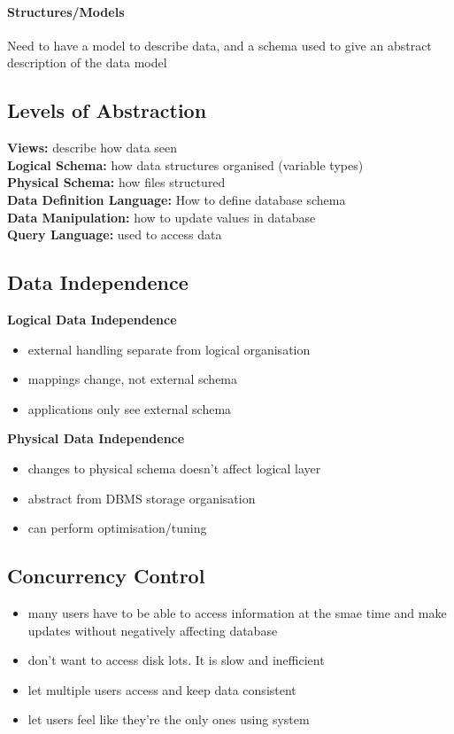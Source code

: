 \documentclass{article}
\newcommand\tab[1][0.5cm]{\hspace*{#1}}
\begin{document}
		\paragraph{Structures/Models}
		Need to have a model to describe data, and a schema used to give an abstract description of the data model

	\subsection{Levels of Abstraction}
		\tab \textbf{Views:} describe how data seen
		\\ \tab \textbf{Logical Schema:} how data structures organised (variable types)
		\\ \tab \textbf{Physical Schema:} how files structured
		\\ \tab \textbf{Data Definition Language:} How to define database schema
		\\ \tab \textbf{Data Manipulation:} how to update values in database 
		\\ \tab \textbf{Query Language:} used to access data 

	\subsection{Data Independence}
		\tab \textbf{Logical Data Independence}
		\begin{itemize}
			\item external handling separate from logical organisation
			\item mappings change, not external schema
			\item applications only see external schema
		\end{itemize}
		\tab \textbf{Physical Data Independence}
		\begin{itemize}
			\item changes to physical schema doesn't affect logical layer
			\item abstract from DBMS storage organisation
			\item can perform optimisation/tuning
		\end{itemize}

	\subsection{Concurrency Control}
		\begin{itemize}
			\item many users have to be able to access information at the smae time and make updates without negatively affecting database
			\item don't want to access disk lots. It is slow and inefficient
			\item let multiple users access and keep data consistent
			\item let users feel like they're the only ones using system
		\end{itemize}
\end{document}
